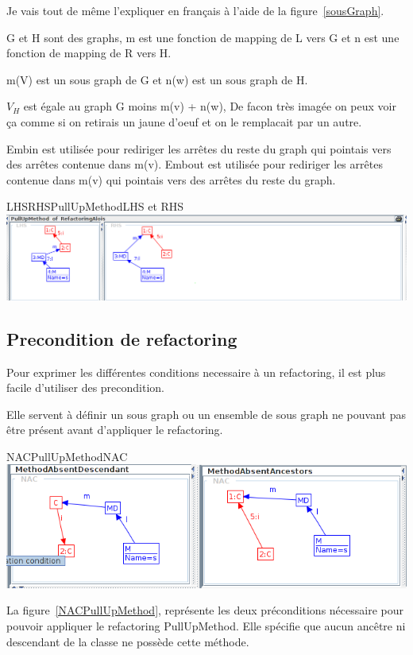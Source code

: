 \documentclass[a4paper, 12pt]{article}
\begin{document}
Je vais tout de même l'expliquer en français à l'aide de la figure~\ref{sousGraph}.

G et H sont des graphs, m est une fonction de mapping de L vers G et n est une fonction de mapping de R vers H.

m(V) est un sous graph de G et n(w) est un sous graph de H.

{$V_H$} est égale au graph G moins m(v) + n(w), De facon très imagée on peux voir ça comme si on retirais un jaune d'oeuf et on le remplacait par un autre.

Embin est utilisée pour rediriger les arrêtes du reste du graph qui pointais vers des arrêtes contenue dans m(v).
Embout est utilisée pour rediriger les arrêtes contenue dans m(v) qui pointais vers des arrêtes du reste du graph.


\begin{myfig}{LHSRHSPullUpMethod}{LHS et RHS}
\includegraphics[width=\textwidth]{LHSRHSPullUpMethod.png}
\end{myfig}

\subsection{Precondition de refactoring}
Pour exprimer les différentes conditions necessaire à un refactoring, il est plus facile d'utiliser des precondition.

Elle servent à définir un sous graph ou un ensemble de sous graph ne pouvant pas être présent avant d'appliquer le refactoring.


\begin{myfig}{NACPullUpMethod}{NAC}
\includegraphics[width=\textwidth]{NACPullUpMethod.png}
\end{myfig}

La figure~\ref{NACPullUpMethod}, représente les deux préconditions nécessaire pour pouvoir appliquer le refactoring PullUpMethod.
Elle spécifie que aucun ancêtre ni descendant de la classe ne possède cette méthode.
\end{document}
